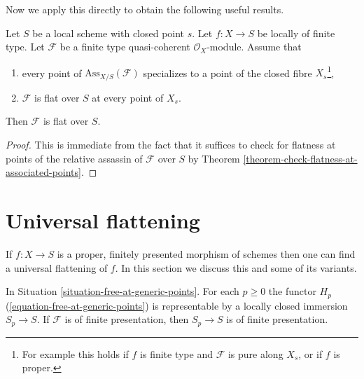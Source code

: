 \noindent
Now we apply this directly to obtain the following useful results.

\begin{lemma}
\label{lemma-check-along-closed-fibre}
Let $S$ be a local scheme with closed point $s$.
Let $f : X \to S$ be locally of finite type.
Let $\mathcal{F}$ be a finite type quasi-coherent $\mathcal{O}_X$-module.
Assume that
\begin{enumerate}
\item every point of $\text{Ass}_{X/S}(\mathcal{F})$ specializes
to a point of the closed fibre $X_s$\footnote{For example this holds if
$f$ is finite type and $\mathcal{F}$ is pure along $X_s$, or
if $f$ is proper.},
\item $\mathcal{F}$ is flat over $S$ at every point of $X_s$.
\end{enumerate}
Then $\mathcal{F}$ is flat over $S$.
\end{lemma}

\begin{proof}
This is immediate from the fact that it suffices to check for
flatness at points of the relative assassin of $\mathcal{F}$
over $S$ by
Theorem \ref{theorem-check-flatness-at-associated-points}.
\end{proof}











\section{Universal flattening}
\label{section-flattening-final}

\noindent
If $f : X \to S$ is a proper, finitely presented morphism
of schemes then one can find a universal flattening of $f$.
In this section we discuss this and some of its variants.

\begin{lemma}
\label{lemma-free-at-generic-points-representable}
In Situation \ref{situation-free-at-generic-points}.
For each $p \geq 0$ the functor $H_p$
(\ref{equation-free-at-generic-points}) is representable
by a locally closed immersion $S_p \to S$. If $\mathcal{F}$
is of finite presentation, then $S_p \to S$ is of finite presentation.
\end{lemma}

